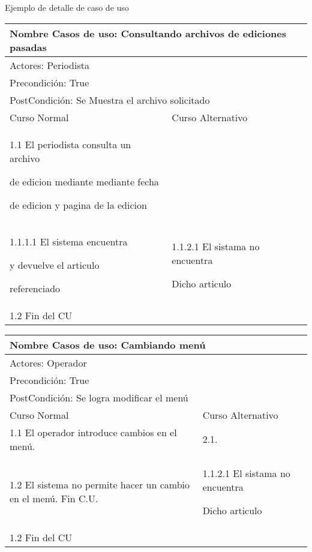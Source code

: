 \documentclass[a4paper,10pt]{article}
\begin{document}
Ejemplo de detalle de caso de uso
\begin{center}
\begin{tabularx}{14cm}{|X|X|}
\hline
\multicolumn{2}{|l|}{Nombre Casos de uso: Consultando archivos de ediciones pasadas}\\
\hline
\multicolumn{2}{|l|}{Actores: Periodista}\\
\hline
\multicolumn{2}{|l|}{Precondici\'on: True}\\
\hline
\multicolumn{2}{|l|}{PostCondici\'on: Se Muestra el archivo solicitado}\\
\hline
Curso Normal & Curso Alternativo\\
\hline
1.1 El periodista consulta un archivo

de edicion mediante mediante fecha

de edicion y pagina de la edicion  & 

\\
\hline
1.1.1.1 El sistema encuentra

y devuelve el articulo 

referenciado &

1.1.2.1 El sistama no encuentra 

Dicho articulo\\
\hline
1.2 Fin del CU & \\
\hline
\end{tabularx}
\end{center}
\begin{center}
\begin{tabularx}{14cm}{|X|X|}
\hline
\multicolumn{2}{|l|}{Nombre Casos de uso: Cambiando menú}\\
\hline
\multicolumn{2}{|l|}{Actores: Operador}\\
\hline
\multicolumn{2}{|l|}{Precondici\'on: True}\\
\hline
\multicolumn{2}{|l|}{PostCondici\'on: Se logra modificar el menú}\\
\hline
Curso Normal & Curso Alternativo\\
\hline
1.1 El operador introduce cambios en el menú.  &
2.1. 

\\
\hline
1.2 El sistema no permite hacer un cambio en el menú. Fin C.U. &
1.1.2.1 El sistama no encuentra 

Dicho articulo\\
\hline
1.2 Fin del CU & \\
\hline
\end{tabularx}
\end{center}
\end{document}
